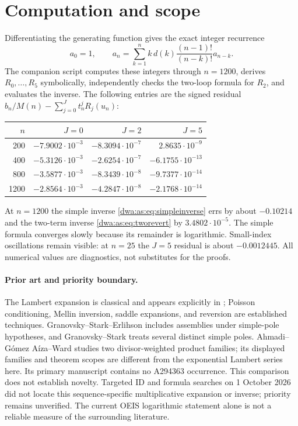 \documentclass[11pt,letterpaper]{article}
\numberwithin{equation}{section}
\theoremstyle{remark}
\begin{document}
\section{Computation and scope}\label{dwa:as:sec:scope}
Differentiating the generating function gives the exact integer recurrence
\begin{equation}\label{dwa:as:eq:recurrence}
 a_0=1,\qquad
 a_n=\sum_{k=1}^n k\,d(k)\frac{(n-1)!}{(n-k)!}a_{n-k}.
\end{equation}
The companion script computes these integers through $n=1200$, derives $R_0,\ldots,R_5$ symbolically, independently checks the two-loop formula for $R_2$, and evaluates the inverse. The following entries are the signed residual
$b_n/M(n)-\sum_{j=0}^Jt_n^jR_j(u_n)$:
\begin{center}
\begin{tabular}{rrrr}\toprule
$n$ & $J=0$ & $J=2$ & $J=5$\\\midrule
200 & $-7.9002\cdot10^{-3}$ & $-8.3094\cdot10^{-7}$ & $2.8635\cdot10^{-9}$\\
400 & $-5.3126\cdot10^{-3}$ & $-2.6254\cdot10^{-7}$ & $-6.1755\cdot10^{-13}$\\
800 & $-3.5877\cdot10^{-3}$ & $-8.3439\cdot10^{-8}$ & $-9.7377\cdot10^{-14}$\\
1200 & $-2.8564\cdot10^{-3}$ & $-4.2847\cdot10^{-8}$ & $-2.1768\cdot10^{-14}$\\\bottomrule
\end{tabular}
\end{center}
At $n=1200$ the simple inverse \eqref{dwa:as:eq:simpleinverse} errs by about $-0.10214$ and the two-term inverse \eqref{dwa:as:eq:tworevert} by $3.4802\cdot10^{-5}$. The simple formula converges slowly because its remainder is logarithmic. Small-index oscillations remain visible: at $n=25$ the $J=5$ residual is about $-0.0012445$. All numerical values are diagnostics, not substitutes for the proofs.

\paragraph{Prior art and priority boundary.}
The Lambert expansion is classical and appears explicitly in \cite{BW}; Poisson conditioning, Mellin inversion, saddle expansions, and reversion are established techniques. Granovsky--Stark--Erlihson \cite{GSE} includes assemblies under simple-pole hypotheses, and Granovsky--Stark \cite{GS} treats several distinct simple poles. Ahmadi--G\'omez A\'iza--Ward \cite{AGW} studies two divisor-weighted product families; its displayed families and theorem scopes are different from the exponential Lambert series here. Its primary manuscript contains no A294363 occurrence. This comparison does not establish novelty. Targeted ID and formula searches on 1 October 2026 did not locate this sequence-specific multiplicative expansion or inverse; priority remains unverified. The current OEIS logarithmic statement alone is not a reliable measure of the surrounding literature.
\end{document}
